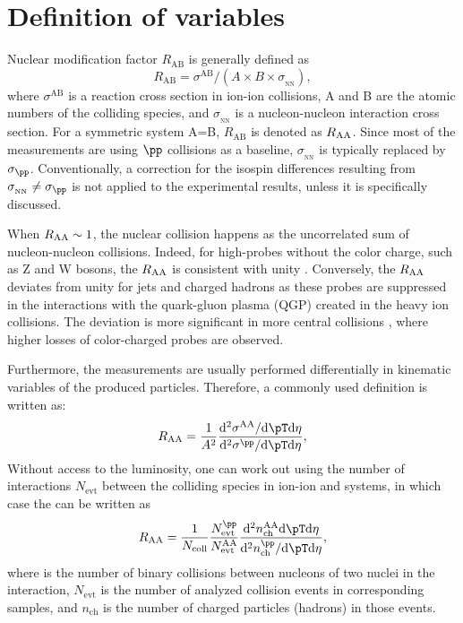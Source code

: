 \section{Definition of variables}
Nuclear modification factor $R_{\mathrm{AB}}$ is generally defined as
\begin{equation}
    R_{\mathrm{AB}} = \sigma^{\mathrm{AB}}/(A\times B \times \sigma_{_{\mathrm{NN}}}),
\end{equation}
where $\sigma^{\mathrm{AB}}$ is a reaction cross section in ion-ion collisions, A and B are the atomic numbers of the colliding species, and $\sigma_{_{\mathrm{NN}}}$ is a nucleon-nucleon interaction cross section. For a symmetric system A=B, $R_{\mathrm{AB}}$ is denoted as $\RAA$. Since most of the measurements are using $\pp$ collisions as a baseline, $\sigma_{_{\mathrm{NN}}}$ is typically replaced by $\sigma_{\pp}$. Conventionally, a correction for the isospin differences resulting from $\sigma_{_{\mathrm{NN}}}\neq\sigma_{\pp}$ is not applied to the experimental results, unless it is specifically discussed. 

When $\RAA \sim 1$, the nuclear collision happens as the uncorrelated sum of nucleon-nucleon collisions. Indeed, for high-\pT probes without the color charge, such as Z and W bosons, the $\RAA$ is consistent with unity \cite{W_boson, Z_boson}. Conversely, the $\RAA$ deviates from unity for jets and charged hadrons as these probes are suppressed in the interactions with the quark-gluon plasma (QGP) created in the heavy ion collisions. The deviation is more significant in more central collisions \cite{jet_RAA}, where higher losses of color-charged probes are observed.

Furthermore, the measurements are usually performed differentially in kinematic variables of the produced particles. Therefore, a commonly used definition is written as: 
\begin{equation}
    \RAA = \frac{1}{A^2}\frac{\dd^2 \sigma^{\text{AA}}/\dd\pT\dd\eta }{\dd^2\sigma^{\pp} / \dd\pT\dd\eta},
\end{equation}
Without access to the luminosity, one can work out \RAA using the number of interactions $N_\mathrm{evt}$ between the colliding species in ion-ion and \pp systems, in which case the \RAA can be written as
\begin{equation}
    \RAA = 
    \frac{1}{\Ncoll}
    \frac{N^{\pp}_{\mathrm{evt}}}{N^{\mathrm{AA}}_{\mathrm{evt}}}
    \frac{\dd^2 n^{\mathrm{AA}}_{\mathrm{ch}}\dd\pT\dd\eta}
         {\dd^2 n^{\pp}_{\mathrm{ch}}/\dd\pT\dd\eta},
    \label{eqn:RAA_measurable}
\end{equation}
where \Ncoll is the number of binary collisions between nucleons of two nuclei in the interaction, $N_{\mathrm{evt}}$ is the number of analyzed collision events in corresponding samples, and $n_{\mathrm{ch}}$ is the number of charged particles (hadrons) in those events. 

